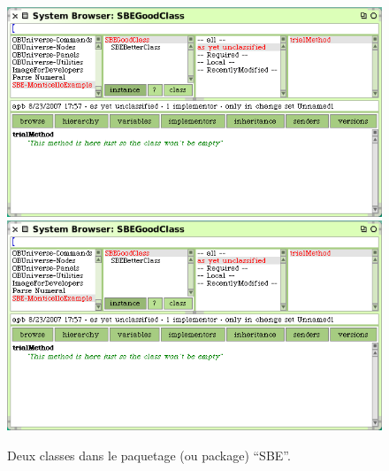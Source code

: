 \documentclass[a4paper,10pt,twoside]{book}
\begin{document}
\begin{figure}[btp]
	\begin{center}
	\ifluluelse
		{\includegraphics[width=\textwidth]{MCnewcategory}}
		{\includegraphics[scale=0.7]{MCnewcategory}}
	\end{center}
	\caption{Deux classes dans le paquetage (ou package) ``SBE''.}
	\label{fig:MCnewcategory}
\end{figure}
\end{document}
